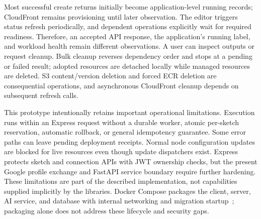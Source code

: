 Most successful create returns initially become application-level running records; CloudFront remains provisioning until later observation. The editor triggers status refresh periodically, and dependent operations explicitly wait for required readiness. Therefore, an accepted API response, the application's running label, and workload health remain different observations. A user can inspect outputs or request cleanup. Bulk cleanup reverses dependency order and stops at a pending or failed result; adopted resources are detached locally while managed resources are deleted. S3 content/version deletion and forced ECR deletion are consequential operations, and asynchronous CloudFront cleanup depends on subsequent refresh calls.

This prototype intentionally retains important operational limitations. Execution runs within an Express request without a durable worker, atomic per-sketch reservation, automatic rollback, or general idempotency guarantee. Some error paths can leave pending deployment receipts. Normal node configuration updates are blocked for live resources even though update dispatchers exist. Express protects sketch and connection APIs with JWT ownership checks, but the present Google profile exchange and FastAPI service boundary require further hardening. These limitations are part of the described implementation, not capabilities supplied implicitly by the libraries. Docker Compose packages the client, server, AI service, and database with internal networking and migration startup~\cite{compose}; packaging alone does not address these lifecycle and security gaps.
